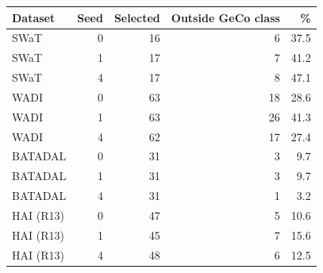 \begin{tabular}{lrrrr}
\toprule
Dataset & Seed & Selected & Outside GeCo class & \% \\
\midrule
SWaT & 0 & 16 & 6 & 37.5 \\
SWaT & 1 & 17 & 7 & 41.2 \\
SWaT & 4 & 17 & 8 & 47.1 \\
WADI & 0 & 63 & 18 & 28.6 \\
WADI & 1 & 63 & 26 & 41.3 \\
WADI & 4 & 62 & 17 & 27.4 \\
BATADAL & 0 & 31 & 3 & 9.7 \\
BATADAL & 1 & 31 & 3 & 9.7 \\
BATADAL & 4 & 31 & 1 & 3.2 \\
HAI (R13) & 0 & 47 & 5 & 10.6 \\
HAI (R13) & 1 & 45 & 7 & 15.6 \\
HAI (R13) & 4 & 48 & 6 & 12.5 \\
\bottomrule
\end{tabular}